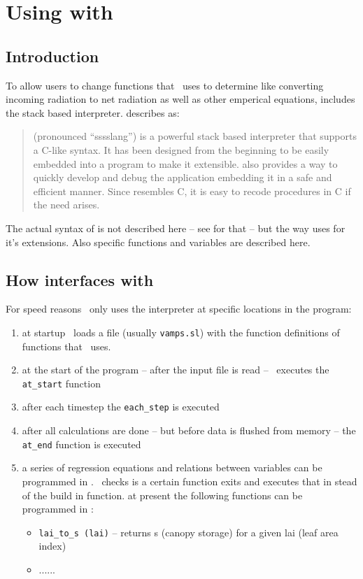 \chapter{Using \slang{} with \vamps{}}

\section{Introduction}
To allow users to change functions that \vamps\ uses to determine
like converting incoming radiation to net radiation as well as other
emperical equations, \vamps{} includes the \slang{} stack based
interpreter.  describes \slang{} as:
\begin{quote}
\slang{} (pronounced ``sssslang'') is a powerful stack based interpreter
   that supports a C-like syntax.  It has been designed from the beginning
   to be easily embedded into a program to make it extensible. \slang{} also
   provides a way to quickly develop and debug the application embedding it
   in a safe and efficient manner.  Since \slang{} resembles C, it is easy to
   recode \slang{} procedures in C if the need arises.
\end{quote}
The actual syntax of \slang{} is not described here -- see
\cite{davis1995282,davis1995283} for that -- but the way \vamps{} uses
\slang{} for it's extensions. Also \vamps{} specific \slang{} functions
and variables are described here.


\section{How \vamps{} interfaces with \slang{}}

For speed reasons \vamps\ only uses the \slang{} interpreter at
specific locations in the program:

\begin{enumerate}
\item at startup \vamps\ loads a file (usually {\tt vamps.sl}) with
the function definitions of functions that \vamps\ uses.
\item at the start of the program -- after the input file is read -- \vamps\
executes the {\tt at\_start} function
\item after each timestep the {\tt each\_step} is executed
\item after all calculations are done -- but before data is flushed
from memory -- the {\tt at\_end} function is executed
\item a series of regression equations and relations between variables
can be programmed in \slang{}. \vamps\ checks is a certain \slang{} function
exits and executes that in stead of the build in function. at present the
following functions can be programmed in \slang{}:
\begin{itemize}
\item {\tt lai\_to\_s (lai)} -- returns s (canopy storage) for a given lai (leaf area
index)
\item ......
\end{itemize}
\end{enumerate}



